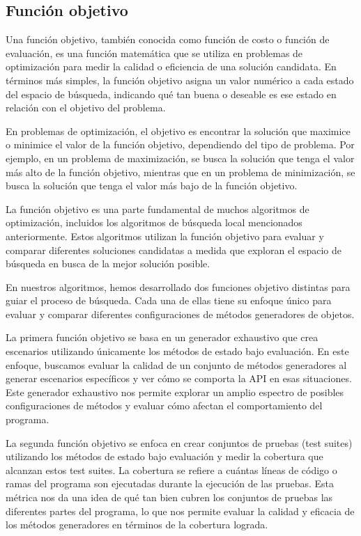 \subsection{Función objetivo}
\label{sec:fitness}

Una función objetivo, también conocida como función de costo o función de evaluación, es una función matemática que se utiliza en problemas de optimización para medir la calidad o eficiencia de una solución candidata. En términos más simples, la función objetivo asigna un valor numérico a cada estado del espacio de búsqueda, indicando qué tan buena o deseable es ese estado en relación con el objetivo del problema.

En problemas de optimización, el objetivo es encontrar la solución que maximice o minimice el valor de la función objetivo, dependiendo del tipo de problema. Por ejemplo, en un problema de maximización, se busca la solución que tenga el valor más alto de la función objetivo, mientras que en un problema de minimización, se busca la solución que tenga el valor más bajo de la función objetivo.

La función objetivo es una parte fundamental de muchos algoritmos de optimización, incluidos los algoritmos de búsqueda local mencionados anteriormente. Estos algoritmos utilizan la función objetivo para evaluar y comparar diferentes soluciones candidatas a medida que exploran el espacio de búsqueda en busca de la mejor solución posible.


En nuestros algoritmos, hemos desarrollado dos funciones objetivo distintas para guiar el proceso de búsqueda. Cada una de ellas tiene su enfoque único para evaluar y comparar diferentes configuraciones de métodos generadores de objetos.

La primera función objetivo se basa en un generador exhaustivo que crea escenarios utilizando únicamente los métodos de estado bajo evaluación. En este enfoque, buscamos evaluar la calidad de un conjunto de métodos generadores al generar escenarios específicos y ver cómo se comporta la API en esas situaciones. Este generador exhaustivo nos permite explorar un amplio espectro de posibles configuraciones de métodos y evaluar cómo afectan el comportamiento del programa.

La segunda función objetivo se enfoca en crear conjuntos de pruebas (test suites) utilizando los métodos de estado bajo evaluación y medir la cobertura que alcanzan estos test suites. La cobertura se refiere a cuántas líneas de código o ramas del programa son ejecutadas durante la ejecución de las pruebas. Esta métrica nos da una idea de qué tan bien cubren los conjuntos de pruebas las diferentes partes del programa, lo que nos permite evaluar la calidad y eficacia de los métodos generadores en términos de la cobertura lograda.

